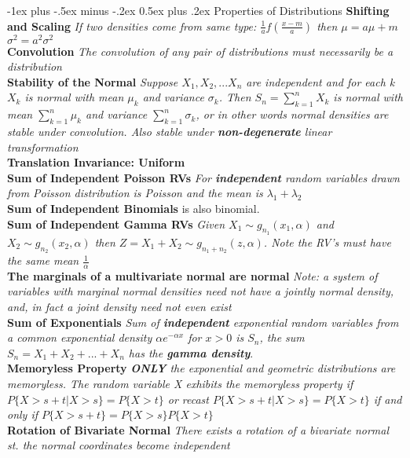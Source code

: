 \documentclass[10pt,landscape]{article}
\makeatletter
\renewcommand{\section}{\@startsection{section}{1}{0mm}%
                                {-1ex plus -.5ex minus -.2ex}%
                                {0.5ex plus .2ex}%
                                {\normalfont\large\bfseries}}
\makeatother
\begin{document}
\begin{multicols*}{3}
\section{Properties of Distributions}
\textbf{Shifting and Scaling} \textit{If two densities come from same type: $\frac{1}{a}f(\frac{x-m}{a})$ then $\mu =a\mu +m$ $\sigma^2=a^2\sigma^2$}\\
\textbf{Convolution }\textit{The convolution of any pair of distributions must necessarily be a distribution}\\
\textbf{Stability of the Normal}
\textit{Suppose $X_1,X_2,...X_n$ are independent and for each k $X_k$ is normal with mean $\mu_k$ and variance $\sigma_k$. Then $S_n = \sum_{k=1}^{n}X_k$ is normal with mean $\sum_{k=1}^{n} \mu_k$ and variance  $\sum_{k=1}^{n} \sigma_k$, or in other words normal densities are stable under convolution. Also stable under \textbf{non-degenerate} linear transformation}\\
\textbf{Translation Invariance: Uniform}\\
\textbf{Sum of Independent Poisson RVs}
\textit{For \textbf{independent} random variables drawn from Poisson distribution is Poisson and the mean is $\lambda_1 + \lambda_2$}\\
\textbf{Sum of Independent Binomials} is also binomial.\\
\textbf{Sum of Independent Gamma RVs}
\textit{Given $X_1 \sim g_{n_1}(x_1,\alpha)$ and $X_2 \sim g_{n_2}(x_2,\alpha)$ then $Z=X_1+X_2 \sim g_{n_1+n_2}(z,\alpha)$. Note the RV's must have the same mean $\frac{1}{\alpha}$}\\
\textbf{The marginals of a multivariate normal are normal }\textit{Note: a system of variables with marginal normal densities need not have a jointly normal density, and, in fact a joint density need not even exist}\\
\textbf{Sum of Exponentials} \textit{Sum of \textbf{independent} exponential random variables from a common exponential density $\alpha e^{-\alpha x}$ for $x>0$ is $S_n$, the sum $S_n= X_1+X_2+...+X_n$ has the \textbf{gamma density}}.\\
\textbf{Memoryless Property} \textit{\textbf{ONLY} the exponential and geometric distributions are memoryless. The random variable X exhibits the memoryless property if $P\{X>s+t|X>s\}=P\{X>t\}$ or recast
	$P\{X>s+t | X>s\}=P\{X>t\}$ if and only if $P\{X>s+t\}=P\{X>s\}P\{X>t\}$}\\
\textbf{Rotation of Bivariate Normal} \textit{There exists a rotation of a bivariate normal st. the normal coordinates become independent}

\end{multicols*}
\end{document}
